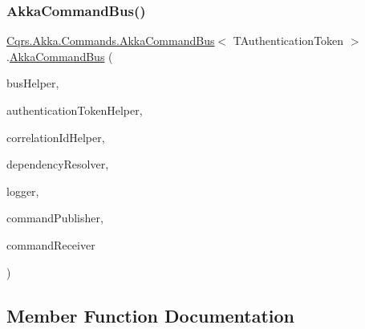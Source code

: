 \subsubsection{\texorpdfstring{Akka\+Command\+Bus()}{AkkaCommandBus()}}
{\footnotesize\ttfamily \hyperlink{classCqrs_1_1Akka_1_1Commands_1_1AkkaCommandBus}{Cqrs.\+Akka.\+Commands.\+Akka\+Command\+Bus}$<$ T\+Authentication\+Token $>$.\hyperlink{classCqrs_1_1Akka_1_1Commands_1_1AkkaCommandBus}{Akka\+Command\+Bus} (\begin{DoxyParamCaption}\item[{\hyperlink{interfaceCqrs_1_1Bus_1_1IBusHelper}{I\+Bus\+Helper}}]{bus\+Helper,  }\item[{\hyperlink{interfaceCqrs_1_1Authentication_1_1IAuthenticationTokenHelper}{I\+Authentication\+Token\+Helper}$<$ T\+Authentication\+Token $>$}]{authentication\+Token\+Helper,  }\item[{I\+Correlation\+Id\+Helper}]{correlation\+Id\+Helper,  }\item[{\hyperlink{interfaceCqrs_1_1Configuration_1_1IDependencyResolver}{I\+Dependency\+Resolver}}]{dependency\+Resolver,  }\item[{I\+Logger}]{logger,  }\item[{\hyperlink{interfaceCqrs_1_1Commands_1_1ICommandPublisher}{I\+Command\+Publisher}$<$ T\+Authentication\+Token $>$}]{command\+Publisher,  }\item[{\hyperlink{interfaceCqrs_1_1Commands_1_1ICommandReceiver}{I\+Command\+Receiver}$<$ T\+Authentication\+Token $>$}]{command\+Receiver }\end{DoxyParamCaption})}



\subsection{Member Function Documentation}
\mbox{\label{classCqrs_1_1Akka_1_1Commands_1_1AkkaCommandBus_ae3e5f1725bceb0359aedb74ded530858_ae3e5f1725bceb0359aedb74ded530858}} 
